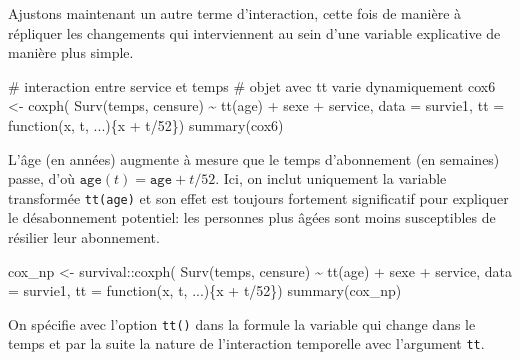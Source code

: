 \documentclass[
  11pt,
  letterpaper,
]{book}
\newenvironment{Shaded}{\begin{snugshade}}{\end{snugshade}}
\newcommand{\AttributeTok}[1]{\textcolor[rgb]{0.40,0.45,0.13}{#1}}
\newcommand{\CommentTok}[1]{\textcolor[rgb]{0.37,0.37,0.37}{#1}}
\newcommand{\ControlFlowTok}[1]{\textcolor[rgb]{0.00,0.23,0.31}{#1}}
\newcommand{\DecValTok}[1]{\textcolor[rgb]{0.68,0.00,0.00}{#1}}
\newcommand{\FunctionTok}[1]{\textcolor[rgb]{0.28,0.35,0.67}{#1}}
\newcommand{\NormalTok}[1]{\textcolor[rgb]{0.00,0.23,0.31}{#1}}
\newcommand{\OtherTok}[1]{\textcolor[rgb]{0.00,0.23,0.31}{#1}}
\newcommand{\SpecialCharTok}[1]{\textcolor[rgb]{0.37,0.37,0.37}{#1}}
\theoremstyle{definition}
\theoremstyle{remark}
\begin{document}
Ajustons maintenant un autre terme d'interaction, cette fois de manière
à répliquer les changements qui interviennent au sein d'une variable
explicative de manière plus simple.

\begin{Shaded}
\begin{Highlighting}[]
\CommentTok{\# interaction entre service et temps}
\CommentTok{\# objet avec \textquotesingle{}tt\textquotesingle{} varie dynamiquement}
\NormalTok{cox6 }\OtherTok{\textless{}{-}} \FunctionTok{coxph}\NormalTok{(}
    \FunctionTok{Surv}\NormalTok{(temps, censure) }\SpecialCharTok{\textasciitilde{}} 
     \FunctionTok{tt}\NormalTok{(age) }\SpecialCharTok{+}\NormalTok{ sexe }\SpecialCharTok{+}\NormalTok{ service, }
     \AttributeTok{data =}\NormalTok{ survie1, }
     \AttributeTok{tt =} \ControlFlowTok{function}\NormalTok{(x, t, ...)\{x }\SpecialCharTok{+}\NormalTok{ t}\SpecialCharTok{/}\DecValTok{52}\NormalTok{\})}
\FunctionTok{summary}\NormalTok{(cox6)}
\end{Highlighting}
\end{Shaded}

L'âge (en années) augmente à mesure que le temps d'abonnement (en
semaines) passe, d'où \(\texttt{age}(t) = \texttt{age} + t/52\). Ici, on
inclut uniquement la variable transformée \texttt{tt(age)} et son effet
est toujours fortement significatif pour expliquer le désabonnement
potentiel: les personnes plus âgées sont moins susceptibles de résilier
leur abonnement.

\begin{Shaded}
\begin{Highlighting}[]
\NormalTok{cox\_np }\OtherTok{\textless{}{-}}\NormalTok{ survival}\SpecialCharTok{::}\FunctionTok{coxph}\NormalTok{(}
    \FunctionTok{Surv}\NormalTok{(temps, censure) }\SpecialCharTok{\textasciitilde{}} 
     \FunctionTok{tt}\NormalTok{(age) }\SpecialCharTok{+}\NormalTok{ sexe }\SpecialCharTok{+}\NormalTok{ service, }
     \AttributeTok{data =}\NormalTok{ survie1, }
     \AttributeTok{tt =} \ControlFlowTok{function}\NormalTok{(x, t, ...)\{x }\SpecialCharTok{+}\NormalTok{ t}\SpecialCharTok{/}\DecValTok{52}\NormalTok{\})}
\FunctionTok{summary}\NormalTok{(cox\_np)}
\end{Highlighting}
\end{Shaded}

On spécifie avec l'option \texttt{tt()} dans la formule la variable qui
change dans le temps et par la suite la nature de l'interaction
temporelle avec l'argument \texttt{tt}.
\end{document}
